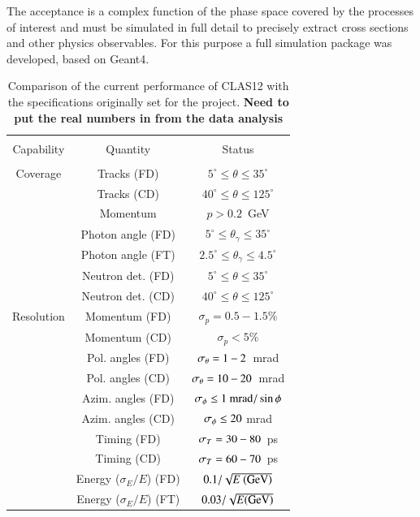 \documentclass[final,3p,times,twocolumn,authoryear]{elsarticle}
\begin{document}
The acceptance is a complex function of the phase space covered by the processes of interest and must be simulated in 
full detail to precisely extract cross sections and other physics observables.  For this purpose a full simulation package was
developed, based on Geant4. 

\begin{table}[ht!]
\begin{center}
\caption{ Comparison of the current performance of CLAS12 with the specifications originally set for the project. 
  {\bf Need to put the real numbers in from the data analysis} }    
\vspace{0.2cm}\label{clas12-performance}
\footnotesize
\begin{tabular}{|c|c|c|}
\hline
&&\\
Capability &  Quantity & Status\\
&&\\
\hline
Coverage&Tracks (FD) & $5^\circ \le \theta \le 35^\circ $ \\
&Tracks (CD)& $40^\circ \le \theta \le 125^\circ$  \\
&Momentum & $p > 0.2$~GeV \\
&Photon angle (FD)& $5^\circ \le \theta_\gamma \le 35^\circ$ \\  
&Photon angle (FT)& $2.5^\circ \le \theta_\gamma \le 4.5^\circ$ \\  
&Neutron det. (FD) & $5^\circ \le \theta \le 35^\circ $ \\
& Neutron det. (CD) &  $ 40^\circ \le \theta \le 125^\circ$ \\
\hline
Resolution & Momentum (FD)& $\sigma_p =  0.5 - 1.5 \%$  \\
& Momentum (CD) & $\sigma_p  < 5\%$  \\
 & Pol. angles (FD) & $\sigma_\theta = \rm  1- 2$~mrad  \\
 & Pol. angles (CD) & $\sigma_\theta =  \rm 10- 20$~mrad \\
& Azim. angles (FD) & $\sigma_\phi  \le 1~{\rm mrad}/\sin\phi $ \\
& Azim. angles (CD) & $\sigma_\phi \le \rm 20$ mrad \\
 & Timing (FD) & $\sigma_T =\rm  30 - 80$~ps  \\
& Timing (CD) & $\sigma_T = \rm 60 - 70$~ps \\
& Energy ($\sigma_E / E$)  (FD) & $0.1 / \sqrt{E~({\rm GeV})}$ \\
& Energy ($\sigma_E / E$)  (FT) & $0.03 / \sqrt{E({\rm GeV})}$\\

\end{tabular}
\end{center}
\end{table}
\end{document}
